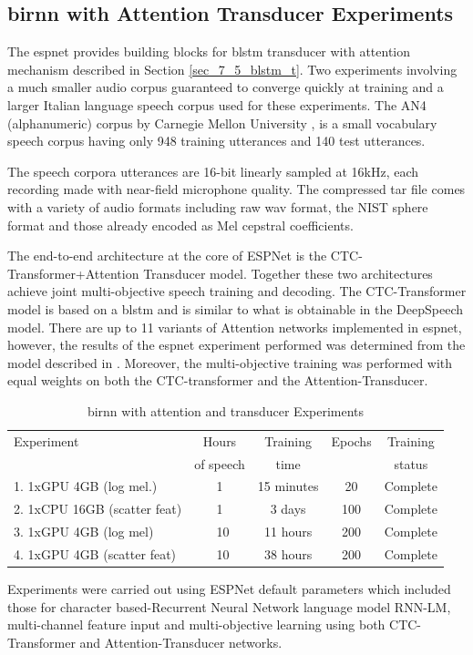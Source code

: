 {\subsection{\acrshort{birnn} with Attention Transducer Experiments}
The \acrfull{espnet} \citep{watanabe2018espnet} provides building blocks for \acrshort{blstm} transducer with attention mechanism  described in Section \ref{sec_7_5_blstm_t}.  Two experiments involving a much smaller audio corpus guaranteed to converge quickly at training and a larger Italian language speech corpus \citep{foxvorge2019} used for these experiments.  The AN4 (alphanumeric) corpus by Carnegie Mellon University \citep{acero1990acoustical}, is a small vocabulary speech corpus having only 948 training utterances and 140 test utterances.

The speech corpora utterances are 16-bit linearly sampled at 16kHz, each recording made with near-field microphone quality.  The compressed tar file comes with a variety of audio formats including raw wav format, the NIST sphere format and those already encoded as Mel cepstral coefficients.

The end-to-end architecture at the core of ESPNet is the CTC-Transformer+Attention Transducer model.  Together these two architectures achieve joint multi-objective speech training and decoding.  The CTC-Transformer model is based on a \acrshort{blstm} and is similar to what is obtainable in the DeepSpeech model.  There are up to 11 variants of Attention networks implemented in \acrshort{espnet}, however, the results of the \acrshort{espnet} experiment performed was determined from the model described in \cite{chorowski2015attention}.  Moreover, the multi-objective training was performed with equal weights on both the CTC-transformer and the Attention-Transducer.  

\begin{table}
  \caption{\acrshort{birnn} with attention and transducer Experiments}
  \label{tab_c6_03_training}
\begin{tabular}{lcccc}
\toprule
Experiment & Hours & Training  & Epochs & Training \\
& of speech & time & & status \\
\midrule
1. 1xGPU 4GB (log mel.) & 1 & 15 minutes & 20 & Complete\\
2. 1xCPU 16GB (scatter feat) & 1 & 3 days & 100 & Complete\\
3. 1xGPU 4GB (log mel) & ~10 & 11 hours & 200 & Complete\\
4. 1xGPU 4GB (scatter feat) & ~10 & 38 hours & 200 & Complete\\
\bottomrule
\end{tabular}
\end{table}
Experiments were carried out using ESPNet default parameters which included those for character based-Recurrent Neural Network language model RNN-LM, multi-channel feature input and multi-objective learning using both CTC-Transformer and Attention-Transducer networks.

}
